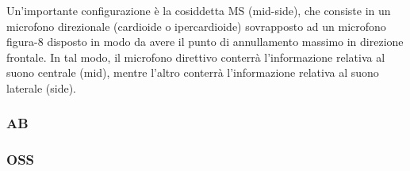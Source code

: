 Un’importante configurazione è la cosiddetta MS (mid-side), che consiste in un
microfono direzionale (cardioide o ipercardioide) sovrapposto ad un microfono
figura-8 disposto in modo da avere il punto di annullamento massimo in direzione
frontale. In tal modo, il microfono direttivo conterrà l’informazione relativa
al suono centrale (mid), mentre l’altro conterrà l’informazione relativa al
suono laterale (side).
\subsubsection*{AB}
\subsubsection*{OSS}
